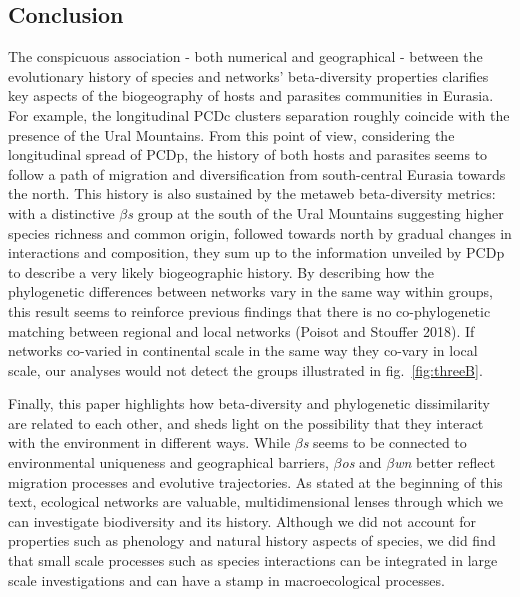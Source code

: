 \documentclass[11pt]{article}
\begin{document}
\hypertarget{conclusion}{%
\subsection{Conclusion}\label{conclusion}}

The conspicuous association - both numerical and geographical - between
the evolutionary history of species and networks' beta-diversity
properties clarifies key aspects of the biogeography of hosts and
parasites communities in Eurasia. For example, the longitudinal PCDc
clusters separation roughly coincide with the presence of the Ural
Mountains. From this point of view, considering the longitudinal spread
of PCDp, the history of both hosts and parasites seems to follow a path
of migration and diversification from south-central Eurasia towards the
north. This history is also sustained by the metaweb beta-diversity
metrics: with a distinctive \emph{\(\beta\)s} group at the south of the
Ural Mountains suggesting higher species richness and common origin,
followed towards north by gradual changes in interactions and
composition, they sum up to the information unveiled by PCDp to describe
a very likely biogeographic history. By describing how the phylogenetic
differences between networks vary in the same way within groups, this
result seems to reinforce previous findings that there is no
co-phylogenetic matching between regional and local networks (Poisot and
Stouffer 2018). If networks co-varied in continental scale in the same
way they co-vary in local scale, our analyses would not detect the
groups illustrated in fig.~\ref{fig:threeB}.

Finally, this paper highlights how beta-diversity and phylogenetic
dissimilarity are related to each other, and sheds light on the
possibility that they interact with the environment in different ways.
While \emph{\(\beta\)s} seems to be connected to environmental
uniqueness and geographical barriers, \emph{\(\beta\)os} and
\emph{\(\beta\)wn} better reflect migration processes and evolutive
trajectories. As stated at the beginning of this text, ecological
networks are valuable, multidimensional lenses through which we can
investigate biodiversity and its history. Although we did not account
for properties such as phenology and natural history aspects of species,
we did find that small scale processes such as species interactions can
be integrated in large scale investigations and can have a stamp in
macroecological processes.
\end{document}
